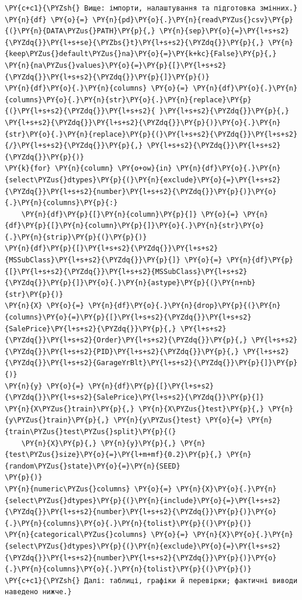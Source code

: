 \begin{Verbatim}[commandchars=\\\{\}]
\PY{c+c1}{\PYZsh{} Вище: імпорти, налаштування та підготовка змінних.}
\PY{n}{df} \PY{o}{=} \PY{n}{pd}\PY{o}{.}\PY{n}{read\PYZus{}csv}\PY{p}{(}\PY{n}{DATA\PYZus{}PATH}\PY{p}{,} \PY{n}{sep}\PY{o}{=}\PY{l+s+s2}{\PYZdq{}}\PY{l+s+se}{\PYZbs{}t}\PY{l+s+s2}{\PYZdq{}}\PY{p}{,} \PY{n}{keep\PYZus{}default\PYZus{}na}\PY{o}{=}\PY{k+kc}{False}\PY{p}{,} \PY{n}{na\PYZus{}values}\PY{o}{=}\PY{p}{[}\PY{l+s+s2}{\PYZdq{}}\PY{l+s+s2}{\PYZdq{}}\PY{p}{]}\PY{p}{)}
\PY{n}{df}\PY{o}{.}\PY{n}{columns} \PY{o}{=} \PY{n}{df}\PY{o}{.}\PY{n}{columns}\PY{o}{.}\PY{n}{str}\PY{o}{.}\PY{n}{replace}\PY{p}{(}\PY{l+s+s2}{\PYZdq{}}\PY{l+s+s2}{ }\PY{l+s+s2}{\PYZdq{}}\PY{p}{,} \PY{l+s+s2}{\PYZdq{}}\PY{l+s+s2}{\PYZdq{}}\PY{p}{)}\PY{o}{.}\PY{n}{str}\PY{o}{.}\PY{n}{replace}\PY{p}{(}\PY{l+s+s2}{\PYZdq{}}\PY{l+s+s2}{/}\PY{l+s+s2}{\PYZdq{}}\PY{p}{,} \PY{l+s+s2}{\PYZdq{}}\PY{l+s+s2}{\PYZdq{}}\PY{p}{)}
\PY{k}{for} \PY{n}{column} \PY{o+ow}{in} \PY{n}{df}\PY{o}{.}\PY{n}{select\PYZus{}dtypes}\PY{p}{(}\PY{n}{exclude}\PY{o}{=}\PY{l+s+s2}{\PYZdq{}}\PY{l+s+s2}{number}\PY{l+s+s2}{\PYZdq{}}\PY{p}{)}\PY{o}{.}\PY{n}{columns}\PY{p}{:}
    \PY{n}{df}\PY{p}{[}\PY{n}{column}\PY{p}{]} \PY{o}{=} \PY{n}{df}\PY{p}{[}\PY{n}{column}\PY{p}{]}\PY{o}{.}\PY{n}{str}\PY{o}{.}\PY{n}{strip}\PY{p}{(}\PY{p}{)}
\PY{n}{df}\PY{p}{[}\PY{l+s+s2}{\PYZdq{}}\PY{l+s+s2}{MSSubClass}\PY{l+s+s2}{\PYZdq{}}\PY{p}{]} \PY{o}{=} \PY{n}{df}\PY{p}{[}\PY{l+s+s2}{\PYZdq{}}\PY{l+s+s2}{MSSubClass}\PY{l+s+s2}{\PYZdq{}}\PY{p}{]}\PY{o}{.}\PY{n}{astype}\PY{p}{(}\PY{n+nb}{str}\PY{p}{)}
\PY{n}{X} \PY{o}{=} \PY{n}{df}\PY{o}{.}\PY{n}{drop}\PY{p}{(}\PY{n}{columns}\PY{o}{=}\PY{p}{[}\PY{l+s+s2}{\PYZdq{}}\PY{l+s+s2}{SalePrice}\PY{l+s+s2}{\PYZdq{}}\PY{p}{,} \PY{l+s+s2}{\PYZdq{}}\PY{l+s+s2}{Order}\PY{l+s+s2}{\PYZdq{}}\PY{p}{,} \PY{l+s+s2}{\PYZdq{}}\PY{l+s+s2}{PID}\PY{l+s+s2}{\PYZdq{}}\PY{p}{,} \PY{l+s+s2}{\PYZdq{}}\PY{l+s+s2}{GarageYrBlt}\PY{l+s+s2}{\PYZdq{}}\PY{p}{]}\PY{p}{)}
\PY{n}{y} \PY{o}{=} \PY{n}{df}\PY{p}{[}\PY{l+s+s2}{\PYZdq{}}\PY{l+s+s2}{SalePrice}\PY{l+s+s2}{\PYZdq{}}\PY{p}{]}
\PY{n}{X\PYZus{}train}\PY{p}{,} \PY{n}{X\PYZus{}test}\PY{p}{,} \PY{n}{y\PYZus{}train}\PY{p}{,} \PY{n}{y\PYZus{}test} \PY{o}{=} \PY{n}{train\PYZus{}test\PYZus{}split}\PY{p}{(}
    \PY{n}{X}\PY{p}{,} \PY{n}{y}\PY{p}{,} \PY{n}{test\PYZus{}size}\PY{o}{=}\PY{l+m+mf}{0.2}\PY{p}{,} \PY{n}{random\PYZus{}state}\PY{o}{=}\PY{n}{SEED}
\PY{p}{)}
\PY{n}{numeric\PYZus{}columns} \PY{o}{=} \PY{n}{X}\PY{o}{.}\PY{n}{select\PYZus{}dtypes}\PY{p}{(}\PY{n}{include}\PY{o}{=}\PY{l+s+s2}{\PYZdq{}}\PY{l+s+s2}{number}\PY{l+s+s2}{\PYZdq{}}\PY{p}{)}\PY{o}{.}\PY{n}{columns}\PY{o}{.}\PY{n}{tolist}\PY{p}{(}\PY{p}{)}
\PY{n}{categorical\PYZus{}columns} \PY{o}{=} \PY{n}{X}\PY{o}{.}\PY{n}{select\PYZus{}dtypes}\PY{p}{(}\PY{n}{exclude}\PY{o}{=}\PY{l+s+s2}{\PYZdq{}}\PY{l+s+s2}{number}\PY{l+s+s2}{\PYZdq{}}\PY{p}{)}\PY{o}{.}\PY{n}{columns}\PY{o}{.}\PY{n}{tolist}\PY{p}{(}\PY{p}{)}
\PY{c+c1}{\PYZsh{} Далі: таблиці, графіки й перевірки; фактичні виводи наведено нижче.}
\end{Verbatim}

